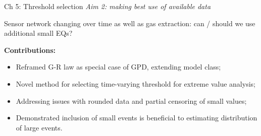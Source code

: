 \documentclass[10pt]{beamer}
\begin{document}
\begin{frame}{Ch 5: Threshold selection}
\textit{\color{orange} Aim 2: making best use of available data} 

Sensor network changing over time as well as gas extraction: can / should we use additional small EQs?

\vspace{1em}
\textbf{Contributions:}

\begin{itemize}
\item Reframed G-R law as special case of GPD, extending model class; 
\item Novel method for selecting time-varying threshold for extreme value analysis; 
\item Addressing issues with rounded data and partial censoring of small values; 
\item Demonstrated inclusion of small events is beneficial to estimating distribution of large events. 
\end{itemize}

\end{frame}
\end{document}
